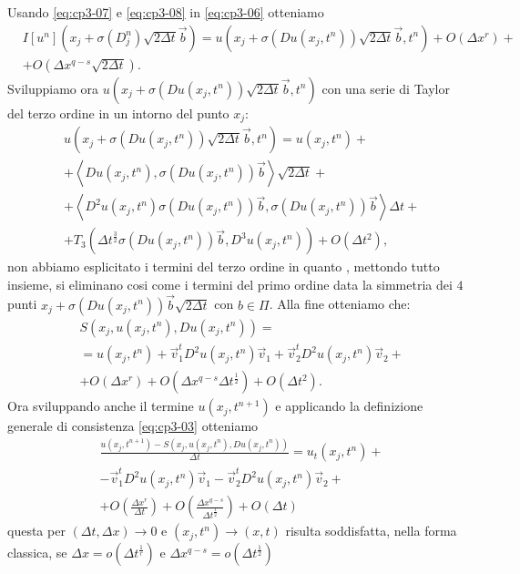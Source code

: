 Usando \eqref{eq:cp3-07} e \eqref{eq:cp3-08} in \eqref{eq:cp3-06} otteniamo
\[
\begin{split}
&I[u^n](x_j+\sigma(D_j^n)\sqrt{2\Delta t}\vec{b})=u(x_j+\sigma(Du(x_j,t^n))\sqrt{2\Delta t}\vec{b},t^n)+O(\Delta x^r)+ \\
& +O(\Delta x^{q-s}\sqrt{2\Delta t}).
\end{split}
\]
Sviluppiamo ora $u(x_j+\sigma(Du(x_j,t^n))\sqrt{2\Delta t}\vec{b},t^n)$ con una serie di Taylor del terzo ordine in un intorno del punto $x_j$:
\begin{equation}
\label{eq:cp3-09}
\begin{split}
&u(x_j+\sigma(Du(x_j,t^n))\sqrt{2\Delta t}\vec{b},t^n) = u(x_j,t^n)+ \\
&+\left<Du(x_j,t^n),\sigma(Du(x_j,t^n))\vec{b}\right>\sqrt{2\Delta t} +\\
&+\left<D^2u(x_j,t^n)\sigma(Du(x_j,t^n))\vec{b},\sigma(Du(x_j,t^n))\vec{b}\right>\Delta t + \\
&+T_3(\Delta t^{\frac{3}{2}}\sigma(Du(x_j,t^n))\vec{b},D^3u(x_j,t^n))+O(\Delta t^2), 
\end{split}
\end{equation}
non abbiamo esplicitato i termini del terzo ordine in quanto , mettondo tutto insieme, si eliminano cosi come i termini del primo ordine data la simmetria dei $4$ punti $x_j+\sigma(Du(x_j,t^n))\vec{b}\sqrt{2\Delta t}$ con $b\in\Pi$. Alla fine otteniamo che:
\begin{equation}
\label{eq:cp3-010}
\begin{split}
& S(x_j,u(x_j,t^n),Du(x_j,t^n)) = \\
& = u(x_j,t^n) + \vec{v}_1^tD^2u(x_j,t^n)\vec{v}_1 + \vec{v}_2^tD^2u(x_j,t^n)\vec{v}_2 + \\
& + O(\Delta x^r) + O(\Delta x^{q-s}\Delta t^{\frac{1}{2}}) + O(\Delta t^2).
\end{split}
\end{equation}
Ora sviluppando  anche il termine $u(x_j,t^{n+1})$ e applicando la definizione generale di consistenza \eqref{eq:cp3-03} otteniamo 
\[
\begin{split}
&\frac{u(x_j,t^{n+1})-S(x_j,u(x_j,t^n),Du(x_j,t^n))}{\Delta t}= u_t(x_j,t^n) + \\
&  -\vec{v}_1^tD^2u(x_j,t^n)\vec{v}_1 -\vec{v}_2^tD^2u(x_j,t^n)\vec{v}_2 + \\
& +O(\frac{\Delta x^r}{\Delta t}) + O(\frac{\Delta x^{q-s}}{\Delta t^{\frac{1}{2}}}) + O(\Delta t)
\end{split}
\]
questa per $(\Delta t,\Delta x)\to 0$ e $(x_j,t^n)\to(x,t)$ risulta soddisfatta, nella forma classica, se $\Delta x = o(\Delta t^{\frac{1}{r}})$ e $\Delta x^{q-s}=o(\Delta t^{\frac{1}{2}})$
%
